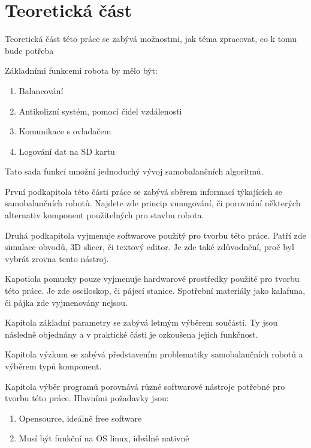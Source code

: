 \chapter{Teoretická část}
Teoretická část této práce se zabývá možnostmi, jak téma zpracovat, co k tomu bude potřeba 
\newline

Základními funkcemi robota by mělo být:
\begin{enumerate}
    \item Balancování
    \item Antikolizní systém, pomocí čidel vzdálenosti
    \item Komunikace s ovladačem
    \item Logování dat na SD kartu
\end{enumerate}

Tato sada funkcí umožní jednoduchý vývoj samobalančních algoritmů.

První podkapitola této části práce se zabývá sběrem informací týkajících se samobalančních robotů. Najdete zde princip vunngování, či porovnání některých alternativ komponent použitelných pro stavbu robota.

Druhá podkapitola vyjmenuje softwarove použitý pro tvorbu této práce. Patří zde simulace obvodů, 3D slicer, či textový editor. Je zde také zdůvodnění, proč byl vybrát zrovna tento nástroj.

Kapotiola pomucky pouze vyjmenuje hardwarové prostředky použité pro tvorbu této práce. Je zde osciloskop, či pájecí stanice. Spotřební materiály jako kalafuna, či pájka zde vyjmenovány nejsou.

Kapitola základní parametry se zabývá letmým výběrem součástí. Ty jsou následně objednány a v praktické části je ozkoušena jejich funkčnost.

Kapitola výzkum se zabývá představením problematiky samobalančních robotů a výběrem typů komponent.

Kapitola výběr programů porovnává různé softwarové nástroje potřebné pro tvorbu této práce. Hlavními požadavky jsou:
\begin{enumerate}
    \item Opensource, ideálně free software
    \item Musí být funkční na OS linux, ideálně nativně
\end{enumerate}
